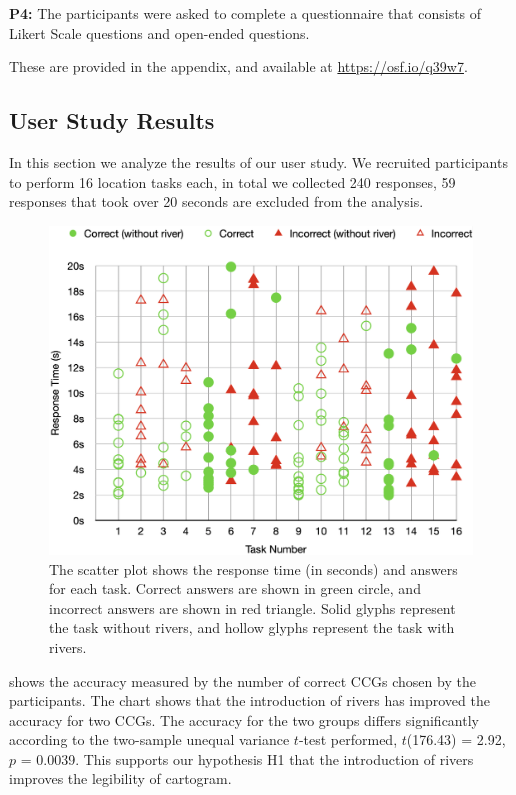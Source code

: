 \textbf{P4:} The participants were asked to complete a questionnaire that consists of Likert Scale questions and open-ended questions.

These are provided in the appendix, and available at \url{https://osf.io/q39w7}.

\subsection{User Study Results}

In this section we analyze the results of our user study. We recruited \pCount participants to perform 16 location tasks each, in total we collected 240 responses, 59 responses that took over 20 seconds are excluded from the analysis.

{
    \begin{figure}[htb!]
        \centering
        \includegraphics[width=\columnwidth,keepaspectratio]{figure/evaluation/task-rt.png}
        \caption{The scatter plot shows the response time (in seconds) and answers for each task. Correct answers are shown in green circle, and incorrect answers are shown in red triangle. Solid glyphs represent the task without rivers, and hollow glyphs represent the task with rivers.}
        \label{fig:task-all}
    \end{figure}
}

  shows the accuracy measured by the number of correct CCGs chosen by the participants. The chart shows that the introduction of rivers has improved the accuracy for two CCGs. The accuracy for the two groups differs significantly according to the two-sample unequal variance $t$-test performed, $t$(176.43) = 2.92, $p$ = 0.0039. This supports our hypothesis H1 that the introduction of rivers improves the legibility of cartogram.

